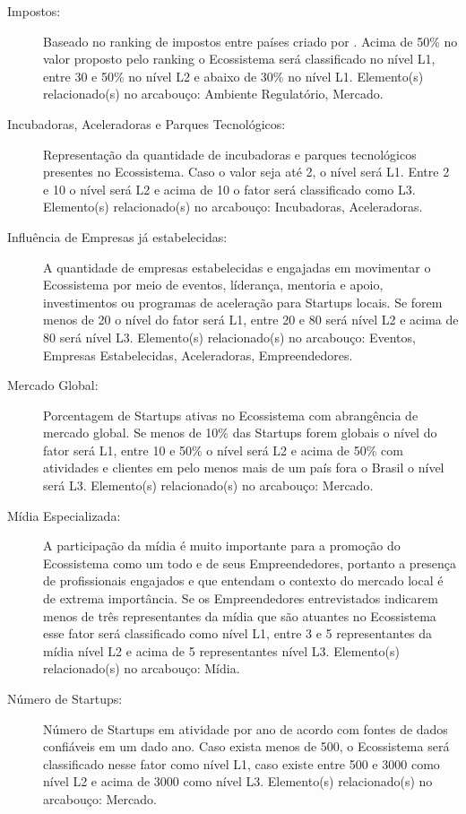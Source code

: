 \begin{description}
  \item [Impostos:] Baseado no ranking de impostos entre países criado por . Acima de 50\% no valor proposto pelo ranking o Ecossistema será classificado no nível L1, entre 30 e 50\% no nível L2 e abaixo de 30\% no nível L1. Elemento(s) relacionado(s) no arcabouço: Ambiente Regulatório, Mercado.
  
  \item [Incubadoras, Aceleradoras e Parques Tecnológicos:] Representação da quantidade de incubadoras e parques tecnológicos presentes no Ecossistema. Caso o valor seja até 2, o nível será L1. Entre 2 e 10 o nível será L2 e acima de 10 o fator será classificado como L3. Elemento(s) relacionado(s) no arcabouço: Incubadoras, Aceleradoras.
  
  \item [Influência de Empresas já estabelecidas:] A quantidade de empresas estabelecidas e engajadas em movimentar o Ecossistema por meio de eventos, líderança, mentoria e apoio, investimentos ou programas de aceleração para Startups locais. Se forem menos de 20 o nível do fator será L1, entre 20 e 80 será nível L2 e acima de 80 será nível L3. Elemento(s) relacionado(s) no arcabouço: Eventos, Empresas Estabelecidas, Aceleradoras, Empreendedores.
  
  \item [Mercado Global:] Porcentagem de Startups ativas no Ecossistema com abrangência de mercado global. Se menos de 10\% das Startups forem globais o nível do fator será L1, entre 10 e 50\% o nível será L2 e acima de 50\% com atividades e clientes em pelo menos mais de um país fora o Brasil o nível será L3. Elemento(s) relacionado(s) no arcabouço: Mercado.
  
  \item [Mídia Especializada:] A participação da mídia é muito importante para a promoção do Ecossistema como um todo e de seus Empreendedores, portanto a presença de profissionais engajados e que entendam o contexto do mercado local é de extrema importância. Se os Empreendedores entrevistados indicarem menos de três representantes da mídia que são atuantes no Ecossistema esse fator será classificado como nível L1, entre 3 e 5 representantes da mídia nível L2 e acima de 5 representantes nível L3. Elemento(s) relacionado(s) no arcabouço: Mídia.
  
  \item [Número de Startups:] Número de Startups em atividade por ano de acordo com fontes de dados confiáveis em um dado ano. Caso exista menos de 500, o Ecossistema será classificado nesse fator como nível L1, caso existe entre 500 e 3000 como nível L2 e acima de 3000 como nível L3. Elemento(s) relacionado(s) no arcabouço: Mercado.
  

\end{description}

